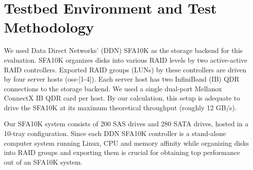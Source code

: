 \section{Testbed Environment and Test Methodology}
\label{sec:testbed}

We used Data Direct Networks' (DDN) SFA10K as the storage backend for this
evaluation. SFA10K organizes disks into various RAID levels by two
active-active RAID controllers. Exported RAID groups (LUNs) by these
controllers are driven by four server hosts (oss-[1-4]).  Each server host has
two InfiniBand (IB) QDR connections to the storage backend.  We used a single
dual-port Mellanox ConnectX IB QDR card per host.  By our calculation, this
setup is adequate to drive the SFA10K at its maximum theoretical throughput
(roughly 12 GB/s). 

Our SFA10K system consists of 200 SAS drives and 280 SATA drives, hosted in a
10-tray configuration.
Since each DDN SFA10K controller is a
stand-alone computer system running Linux, CPU and memory affinity while
organizing disks into RAID groups and exporting them is crucial for obtaining
top performance out of an SFA10K system.  

